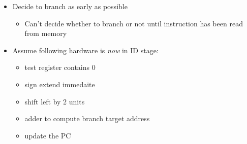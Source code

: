 \begin{frame}[fragile]
\begin{itemize}
\item Decide to branch as early as possible
\begin{itemize}
    \item Can't decide whether to branch or not until instruction has been
  read from memory
\end{itemize}
\item Assume following hardware is \textit{now} in ID stage: 

\begin{multicols}{2}
\begin{itemize}
    \item test register contains 0
    \item sign extend immedaite
    \item shift left by 2 units
    \end{itemize}
\columnbreak    
\begin{itemize}
\item adder to compute branch target address
    \item update the PC
    \end{itemize}
\end{multicols}



	


\end{itemize}
\end{frame}
